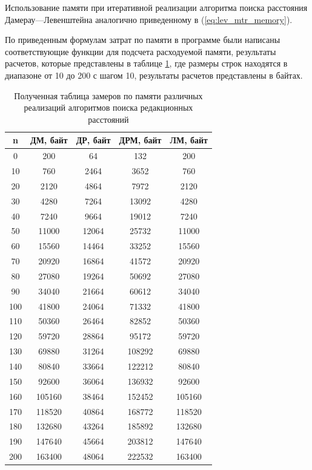 Использование памяти при итеративной реализации алгоритма поиска расстояния Дамерау---Левенштейна аналогично приведенному
в (\ref{eq:lev_mtr_memory}).

По приведенным формулам затрат по памяти в программе были написаны соответствующие функции для подсчета расходуемой памяти, результаты расчетов, которые представлены в таблице \ref{t:memory}, где размеры строк находятся в диапазоне от 10 до 200 с шагом 10, результаты расчетов представлены в байтах.

\clearpage

\begin{table}[!ht]
    \centering
    \caption{Полученная таблица замеров по памяти различных реализаций алгоритмов поиска редакционных расстояний}
    \begin{tabular}{|c|c|c|c|c|}
    \hline
        n & ДМ, байт & ДР, байт & ДРМ, байт & ЛМ, байт \\ \hline
        0 & 200 & 64 & 132 & 200 \\ \hline
        10 & 760 & 2464 & 3652 & 760 \\ \hline
        20 & 2120 & 4864 & 7972 & 2120 \\ \hline
        30 & 4280 & 7264 & 13092 & 4280 \\ \hline
        40 & 7240 & 9664 & 19012 & 7240 \\ \hline
        50 & 11000 & 12064 & 25732 & 11000 \\ \hline
        60 & 15560 & 14464 & 33252 & 15560 \\ \hline
        70 & 20920 & 16864 & 41572 & 20920 \\ \hline
        80 & 27080 & 19264 & 50692 & 27080 \\ \hline
        90 & 34040 & 21664 & 60612 & 34040 \\ \hline
        100 & 41800 & 24064 & 71332 & 41800 \\ \hline
        110 & 50360 & 26464 & 82852 & 50360 \\ \hline
        120 & 59720 & 28864 & 95172 & 59720 \\ \hline
        130 & 69880 & 31264 & 108292 & 69880 \\ \hline
        140 & 80840 & 33664 & 122212 & 80840 \\ \hline
        150 & 92600 & 36064 & 136932 & 92600 \\ \hline
        160 & 105160 & 38464 & 152452 & 105160 \\ \hline
        170 & 118520 & 40864 & 168772 & 118520 \\ \hline
        180 & 132680 & 43264 & 185892 & 132680 \\ \hline
        190 & 147640 & 45664 & 203812 & 147640 \\ \hline
        200 & 163400 & 48064 & 222532 & 163400 \\ \hline
    \end{tabular}
     \label{t:memory}
\end{table}



